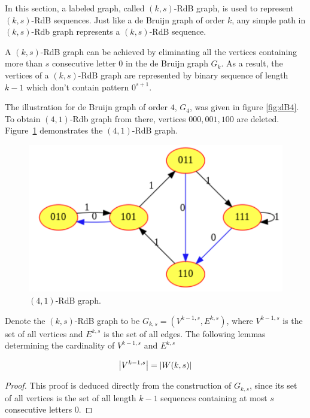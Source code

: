  In this section, a labeled graph, called $(k,s)$-RdB graph, is used to represent $(k,s)$-RdB sequences. Just like a de Bruijn graph of order $k$, any simple path in $(k,s)$-Rdb graph represents a $(k,s)$-RdB sequence.

A $(k,s)$-RdB graph can be achieved by eliminating all the vertices containing more than $s$ consecutive letter $0$ in the de Bruijn graph $G_{k}$. As a result, the vertices of a $(k,s)$-RdB graph are represented by binary sequence of length $k-1$ which don't contain pattern $0^{s+1}$.

The illustration for de Bruijn graph of order $4$, $G_{4}$, was given in figure \ref{fig:dB4}. To obtain $(4,1)$-Rdb graph from there, vertices $000,001,100$ are deleted. Figure~\ref{fig:RdB_4_1} demonstrates the $(4,1)$-RdB graph.

\begin{figure}[htbp]
    \centering
    \includegraphics[scale=0.25]{fig/RdB41.png}
    \caption{$(4,1)$-RdB graph.}
    \label{fig:RdB_4_1}
\end{figure}

Denote the $(k,s)$-RdB graph to be $G_{k,s} = (V^{k-1,s},E^{k,s})$, where $V^{k-1,s}$ is the set of all vertices and $E^{k,s}$ is the set of all edges. The following lemmas determining the cardinality of $V^{k-1,s}$ and $E^{k,s}$

\begin{lemma}\label{lem:num_V}
    \begin{align}
        \left \lvert  V^{k-1,s} \right \rvert = \left \lvert  W(k,s) \right \rvert\label{eq:num_V}
    \end{align}
\end{lemma}
\begin{proof}
    This proof is deduced directly from the construction of $G_{k,s}$, since its set of all vertices is the set of all length $k-1$ sequences containing at most $s$ consecutive letters $0$. 
\end{proof}

